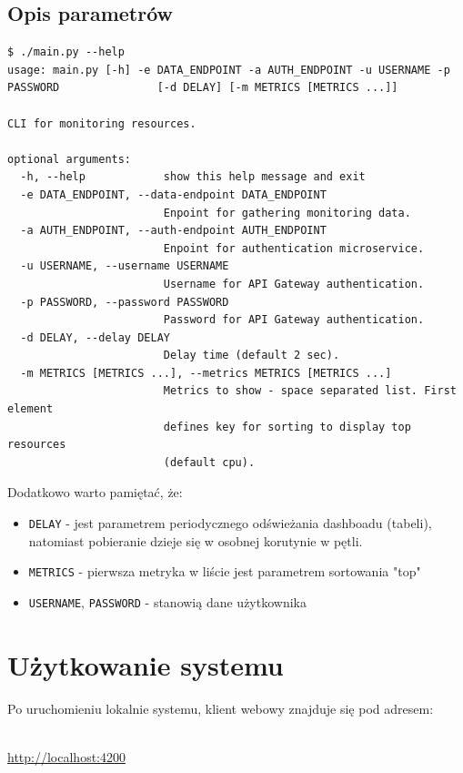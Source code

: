 \documentclass{article}
\begin{document}
\subsection{Opis parametrów}
\begin{lstlisting}
$ ./main.py --help
usage: main.py [-h] -e DATA_ENDPOINT -a AUTH_ENDPOINT -u USERNAME -p PASSWORD               [-d DELAY] [-m METRICS [METRICS ...]]

CLI for monitoring resources.

optional arguments:
  -h, --help            show this help message and exit
  -e DATA_ENDPOINT, --data-endpoint DATA_ENDPOINT
                        Enpoint for gathering monitoring data.
  -a AUTH_ENDPOINT, --auth-endpoint AUTH_ENDPOINT
                        Enpoint for authentication microservice.
  -u USERNAME, --username USERNAME
                        Username for API Gateway authentication.
  -p PASSWORD, --password PASSWORD
                        Password for API Gateway authentication.
  -d DELAY, --delay DELAY
                        Delay time (default 2 sec).
  -m METRICS [METRICS ...], --metrics METRICS [METRICS ...]
                        Metrics to show - space separated list. First element
                        defines key for sorting to display top resources
                        (default cpu).
\end{lstlisting}

Dodatkowo warto pamiętać, że:

\begin{itemize}
\item \texttt{DELAY} - jest parametrem periodycznego odświeżania dashboadu (tabeli), natomiast pobieranie dzieje się w osobnej korutynie w pętli.
\item \texttt{METRICS} - pierwsza metryka w liście jest parametrem sortowania "top"
\item \texttt{USERNAME}, \texttt{PASSWORD} - stanowią dane użytkownika
\end{itemize}

\section{Użytkowanie systemu}
Po uruchomieniu lokalnie systemu, klient webowy znajduje się pod adresem:\\\\
\centerline{\url{http://localhost:4200}}\\\\
\end{document}
